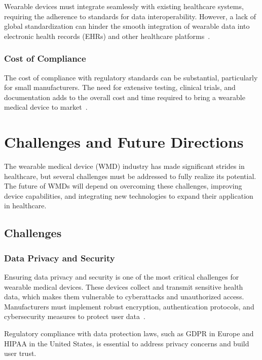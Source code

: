 \documentclass[journal]{IEEEtran}
\begin{document}
        Wearable devices must integrate seamlessly with existing healthcare systems, requiring the adherence to standards for data interoperability. However, a lack of global standardization can hinder the smooth integration of wearable data into electronic health records (EHRs) and other healthcare platforms~\cite{Ravizza2019}.

        \subsubsection{Cost of Compliance}

        The cost of compliance with regulatory standards can be substantial, particularly for small manufacturers. The need for extensive testing, clinical trials, and documentation adds to the overall cost and time required to bring a wearable medical device to market~\cite{Ravizza2019}.

\section{Challenges and Future Directions}
\label{9.Challenges}
The wearable medical device (WMD) industry has made significant strides in healthcare, but several challenges must be addressed to fully realize its potential. The future of WMDs will depend on overcoming these challenges, improving device capabilities, and integrating new technologies to expand their application in healthcare.

    \subsection{Challenges}

        \subsubsection{Data Privacy and Security}

        Ensuring data privacy and security is one of the most critical challenges for wearable medical devices. These devices collect and transmit sensitive health data, which makes them vulnerable to cyberattacks and unauthorized access. Manufacturers must implement robust encryption, authentication protocols, and cybersecurity measures to protect user data~\cite{Iqbal2016}.

        Regulatory compliance with data protection laws, such as GDPR in Europe and HIPAA in the United States, is essential to address privacy concerns and build user trust.
\end{document}
